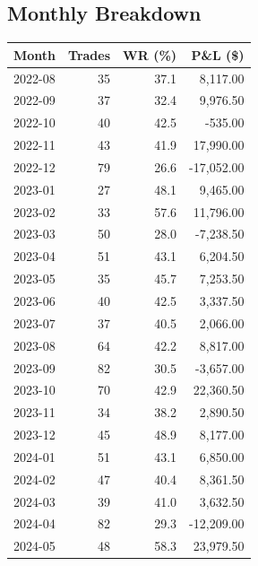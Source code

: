 \documentclass[11pt,a4paper,twoside]{article}
\begin{document}
\subsection{Monthly Breakdown}
\noindent\begin{center}
\begin{tabular}{>{\color{txtmain}}l rrr}
\toprule
\rowcolor{cardbg}
\textbf{Month} & \textbf{Trades} & \textbf{WR (\%)} & \textbf{P\&L (\$)} \\
\midrule
2022-08 & 35 & 37.1 & \textcolor{wingreen}{8,117.00} \\
2022-09 & 37 & 32.4 & \textcolor{wingreen}{9,976.50} \\
2022-10 & 40 & 42.5 & \textcolor{lossred}{-535.00} \\
2022-11 & 43 & 41.9 & \textcolor{wingreen}{17,990.00} \\
2022-12 & 79 & 26.6 & \textcolor{lossred}{-17,052.00} \\
2023-01 & 27 & 48.1 & \textcolor{wingreen}{9,465.00} \\
2023-02 & 33 & 57.6 & \textcolor{wingreen}{11,796.00} \\
2023-03 & 50 & 28.0 & \textcolor{lossred}{-7,238.50} \\
2023-04 & 51 & 43.1 & \textcolor{wingreen}{6,204.50} \\
2023-05 & 35 & 45.7 & \textcolor{wingreen}{7,253.50} \\
2023-06 & 40 & 42.5 & \textcolor{wingreen}{3,337.50} \\
2023-07 & 37 & 40.5 & \textcolor{wingreen}{2,066.00} \\
2023-08 & 64 & 42.2 & \textcolor{wingreen}{8,817.00} \\
2023-09 & 82 & 30.5 & \textcolor{lossred}{-3,657.00} \\
2023-10 & 70 & 42.9 & \textcolor{wingreen}{22,360.50} \\
2023-11 & 34 & 38.2 & \textcolor{wingreen}{2,890.50} \\
2023-12 & 45 & 48.9 & \textcolor{wingreen}{8,177.00} \\
2024-01 & 51 & 43.1 & \textcolor{wingreen}{6,850.00} \\
2024-02 & 47 & 40.4 & \textcolor{wingreen}{8,361.50} \\
2024-03 & 39 & 41.0 & \textcolor{wingreen}{3,632.50} \\
2024-04 & 82 & 29.3 & \textcolor{lossred}{-12,209.00} \\
2024-05 & 48 & 58.3 & \textcolor{wingreen}{23,979.50} \\

\end{tabular}
\end{center}
\end{document}
